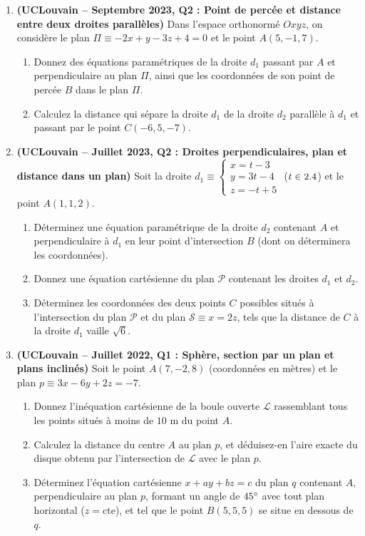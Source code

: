 \begin{enumerate}[label=\textbf{Exercice 7.\arabic* --}, align=left, leftmargin=*]
    \item \textbf{(UCLouvain -- Septembre 2023, Q2 : Point de percée et distance entre deux droites parallèles)}
    Dans l'espace orthonormé $Oxyz$, on considère le plan $\Pi \equiv -2x + y - 3z + 4 = 0$ et le point $A(5, -1, 7)$.
    \begin{enumerate}[label=(\alph*)]
        \item Donnez des équations paramétriques de la droite $d_1$ passant par $A$ et perpendiculaire au plan $\Pi$, ainsi que les coordonnées de son point de percée $B$ dans le plan $\Pi$.
        \item Calculez la distance qui sépare la droite $d_1$ de la droite $d_2$ parallèle à $d_1$ et passant par le point $C(-6, 5, -7)$.
    \end{enumerate}

    \item \textbf{(UCLouvain -- Juillet 2023, Q2 : Droites perpendiculaires, plan et distance dans un plan)}
    Soit la droite $d_1 \equiv \begin{cases} x = t - 3 \\ y = 3t - 4 \\ z = -t + 5 \end{cases}$ ($t \in 2.4$) et le point $A(1, 1, 2)$.
    \begin{enumerate}[label=(\alph*)]
        \item Déterminez une équation paramétrique de la droite $d_2$ contenant $A$ et perpendiculaire à $d_1$ en leur point d'intersection $B$ (dont on déterminera les coordonnées).
        \item Donnez une équation cartésienne du plan $\mathcal{P}$ contenant les droites $d_1$ et $d_2$.
        \item Déterminez les coordonnées des deux points $C$ possibles situés à l'intersection du plan $\mathcal{P}$ et du plan $\mathcal{S} \equiv x = 2z$, tels que la distance de $C$ à la droite $d_1$ vaille $\sqrt{6}$.
    \end{enumerate}

    \item \textbf{(UCLouvain -- Juillet 2022, Q1 : Sphère, section par un plan et plans inclinés)}
    Soit le point $A(7, -2, 8)$ (coordonnées en mètres) et le plan $p \equiv 3x - 6y + 2z = -7$.
    \begin{enumerate}[label=(\alph*)]
        \item Donnez l'inéquation cartésienne de la boule ouverte $\mathcal{L}$ rassemblant tous les points situés à moins de $10\text{ m}$ du point $A$.
        \item Calculez la distance du centre $A$ au plan $p$, et déduisez-en l'aire exacte du disque obtenu par l'intersection de $\mathcal{L}$ avec le plan $p$.
        \item Déterminez l'équation cartésienne $x + ay + bz = c$ du plan $q$ contenant $A$, perpendiculaire au plan $p$, formant un angle de $45\degree$ avec tout plan horizontal ($z = \text{cte}$), et tel que le point $B(5,5,5)$ se situe en dessous de $q$.
    \end{enumerate}


\end{enumerate}
